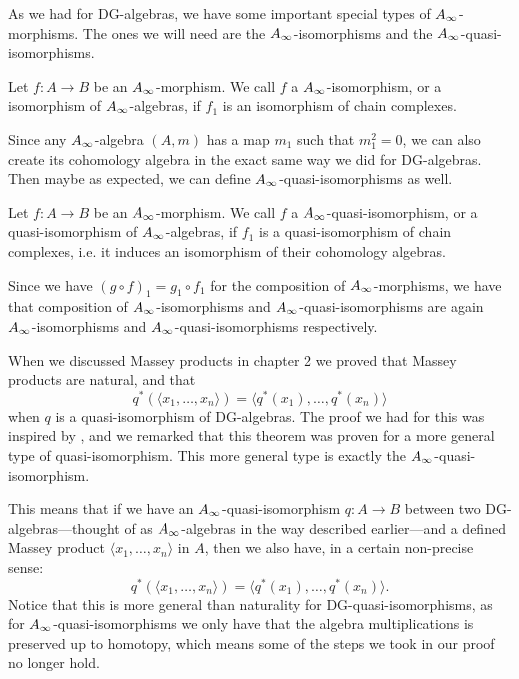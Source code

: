As we had for DG-algebras, we have some important special types of $\A$-morphisms. The ones we will need are the $\A$-isomorphisms and the $\A$-quasi-isomorphisms.

\begin{definition}[$\A$-isomorphism]
Let $f\colon A\longrightarrow B$ be an $\A$-morphism. We call $f$ a $\A$-isomorphism, or a isomorphism of $\A$-algebras, if $f_1$ is an isomorphism of chain complexes.
\end{definition}

Since any $\A$-algebra $(A, m)$ has a map $m_1$ such that $m_1^2=0$, we can also create its cohomology algebra in the exact same way we did for DG-algebras. Then maybe as expected, we can define $\A$-quasi-isomorphisms as well.

\begin{definition}
Let $f\colon A\longrightarrow B$ be an $\A$-morphism. We call $f$ a $\A$-quasi-isomorphism, or a quasi-isomorphism of $\A$-algebras, if $f_1$ is a quasi-isomorphism of chain complexes, i.e. it induces an isomorphism of their cohomology algebras. 
\end{definition}

Since we have $(g\circ f)_1 = g_1\circ f_1$ for the composition of $\A$-morphisms, we have that composition of $\A$-isomorphisms and $\A$-quasi-isomorphisms are again $\A$-isomorphisms and $\A$-quasi-isomorphisms respectively.

\begin{remark}
When we discussed Massey products in chapter 2 we proved that Massey products are natural, and that 
\begin{equation*}
	q^*(\langle x_1, \ldots, x_n\rangle ) = \langle q^*(x_1),\ldots, q^*(x_n)\rangle
\end{equation*}
when $q$ is a quasi-isomorphism of DG-algebras. The proof we had for this was inspired by \cite[Theorem 1.5]{naturality}, and we remarked that this theorem was proven for a more general type of quasi-isomorphism. This more general type is exactly the $\A$-quasi-isomorphism.

This means that if we have an $\A$-quasi-isomorphism $q\colon A\longrightarrow B$ between two DG-algebras---thought of as $\A$-algebras in the way described earlier---and a defined Massey product $\langle x_1, \ldots, x_n\rangle$ in $A$, then we also have, in a certain non-precise sense:
\begin{equation*}
	q^*(\langle x_1, \ldots, x_n\rangle ) = \langle q^*(x_1),\ldots, q^*(x_n)\rangle .
\end{equation*}
Notice that this is more general than naturality for DG-quasi-isomorphisms, as for $\A$-quasi-isomorphisms we only have that the algebra multiplications is preserved up to homotopy, which means some of the steps we took in our proof no longer hold. 
\end{remark}




